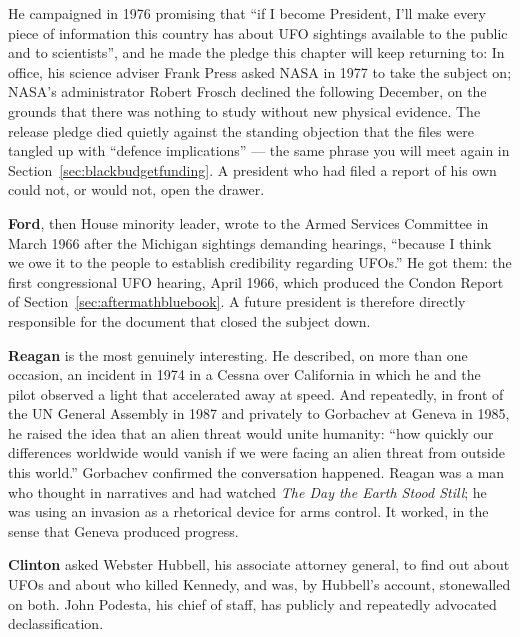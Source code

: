 
He campaigned in 1976 promising that ``if I become
President, I'll make every piece of information this country has about UFO sightings available
to the public and to scientists'', and he made the pledge this chapter will keep returning to:
 In
office, his science adviser Frank Press asked NASA in 1977 to take the subject on; NASA's
administrator Robert Frosch declined the following December, on the grounds that there was
nothing to study without new physical evidence. The release pledge died quietly against the
standing objection that the files were tangled up with ``defence implications'' --- the same
phrase you will meet again in Section~\ref{sec:blackbudgetfunding}. A president who had filed a
report of his own could not, or would not, open the drawer.

\textbf{Ford}, then House minority leader, wrote to the Armed Services Committee in March 1966
after the Michigan sightings demanding hearings, ``because I think we owe it to the people to
establish credibility regarding UFOs.'' He got them: the first congressional UFO hearing, April
1966, which produced the Condon Report of Section~\ref{sec:aftermathbluebook}. A future
president is therefore directly responsible for the document that closed the subject down.

\textbf{Reagan} is the most genuinely interesting. He described, on more than one occasion, an
incident in 1974 in a Cessna over California in which he and the pilot observed a light that
accelerated away at speed. And repeatedly, in front of the UN General Assembly in 1987 and
privately to Gorbachev at Geneva in 1985, he raised the idea that an alien threat would unite
humanity: ``how quickly our differences worldwide would vanish if we were facing an alien
threat from outside this world.'' Gorbachev confirmed the conversation happened. Reagan was a
man who thought in narratives and had watched \emph{The Day the Earth Stood Still}; he was
using an invasion as a rhetorical device for arms control. It worked, in the sense that Geneva
produced progress.

\textbf{Clinton} asked Webster Hubbell, his associate attorney general, to find out about UFOs
and about who killed Kennedy, and was, by Hubbell's account, stonewalled on both. John Podesta,
his chief of staff, has publicly and repeatedly advocated declassification.

